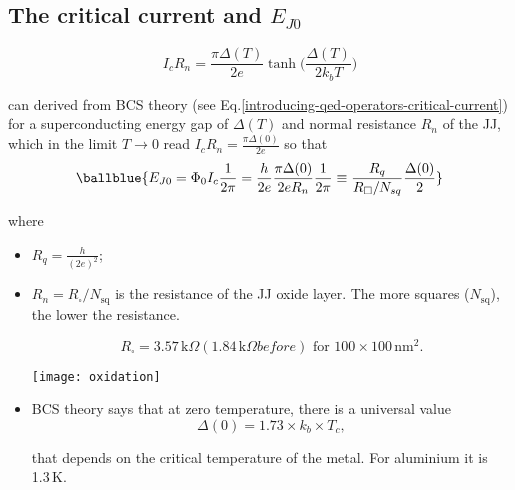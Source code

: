 \begin{framed}
\begin{itemize}
\end{itemize}

\subsection{The critical current and $E_{J0}$}
\label{sec:crit-curr-josephs}

  \begin{equation}
    I_cR_n      =
    \frac{\pi\Delta(T)}{2e}\tanh\big(\frac{\Delta(T)}{2k_bT}\big)
  \end{equation}

  \noindent   can  derived   from   BCS  theory   (see   Eq.\eqref{introducing-qed-operators-critical-current})  for   a
  superconducting  energy  gap  of  $  \Delta(T)  $  and  normal  resistance   $  R_n  $  of  the  JJ,  which  in  the  limit
  $T \rightarrow 0$ read $ I_cR_n = \frac{\pi\Delta(0)}{2e}$ so that
  \begin{equation}
    \ballblue{E_{J0} = \Phi_0I_c\frac{1}{2\pi} = \frac{h}{2e}\frac{\pi\Delta(0)}{2eR_n}\frac{1}{2\pi} \equiv \frac{R_q}{R_{\square}/N_{sq}}\frac{\Delta(0)}{2}}
  \end{equation}

  \noindent where

  \begin{itemize}
  \item $R_{q} = \frac{h}{(2e)^{2}}$;
  \item  $R_n   =  R_{\square}/  N_{\text{sq}}$  is   the  resistance  of  the   JJ  oxide  layer.   The   more   squares ($N_{\text{sq}}$), the lower the resistance.

     \begin{equation}
       R_{\square} = 3.57\,\text{k}\Omega (1.84\,\text{k}\Omega before) \text{ for } 100 \times 100\,\text{nm}^2.
     \end{equation}


    \begin{center}
      \texttt{[image: oxidation]}
    \end{center}

  \item BCS theory says that at zero temperature, there is a universal value
    \begin{equation}
      \Delta(0) = 1.73 \times  k_{b} \times T_{c},
    \end{equation}

    \noindent that depends on the critical temperature of the metal.  For aluminium it is 1.3\,K.
  \end{itemize}
\end{framed}


